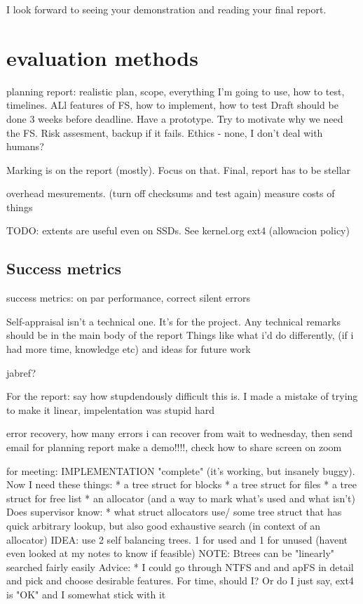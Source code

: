 \documentclass[a4paper]{report}
\begin{document}
        I look forward to seeing your demonstration and reading your final
        report.

    \section{evaluation methods}

    planning report: realistic plan, scope, everything I'm going to use, how to test, timelines. ALl features of FS, how to implement, how to test
    Draft should be done 3 weeks before deadline. Have a prototype. Try to motivate why we need the FS. Risk assesment, backup if it fails. Ethics - none, I don't deal with humans?

    Marking is on the report (mostly). Focus on that. Final, report has to be stellar

    overhead mesurements. (turn off checksums and test again) measure costs of things

    TODO: extents are useful even on SSDs. See kernel.org ext4 (allowacion policy)

        \subsection{Success metrics}
            success metrics: on par performance, correct silent errors

        Self-appraisal isn't a technical one. It's for the project. Any technical remarks should be in the main body of the report
        Things like what i'd do differently, (if i had more time, knowledge etc) and ideas for future work

    jabref?

    For the report: say how stupdendously difficult this is. I made a mistake
    of trying to make it linear, impelentation was stupid hard

    error recovery, how many errors i can recover from
    wait to wednesday, then send email for planning report
    make a demo!!!!, check how to share screen on zoom


    for meeting:
    IMPLEMENTATION "complete" (it's working, but insanely buggy). Now I need these things:
        * a tree struct for blocks
        * a tree struct for files
        * a tree struct for free list
        * an allocator (and a way to mark what's used and what isn't)
    Does supervisor know:
        * what struct allocators use/ some tree struct that has quick arbitrary
        lookup, but also good exhaustive search (in context of an allocator)
        IDEA: use 2 self balancing trees. 1 for used and 1 for unused (havent
        even looked at my notes to know if feasible)
        NOTE: Btrees can be "linearly" searched fairly easily
    Advice:
        * I could go through NTFS and and apFS in detail and pick and choose
            desirable features. For time, should I? Or do I just say, ext4 is "OK"
            and I somewhat stick with it
\end{document}
